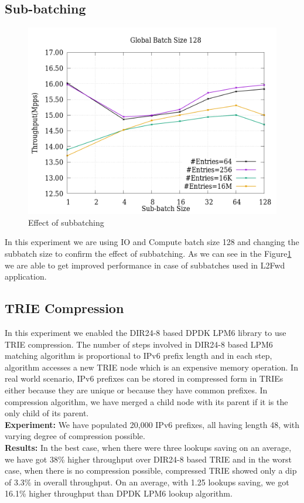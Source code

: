 \subsection{Sub-batching}
\begin{figure}[ht]
\includegraphics[width = \linewidth]{Figures/Subbatching.png}
\caption{Effect of subbatching}
\label{subbatchfigure}
\end{figure}

In this experiment we are using IO and Compute batch size 128 and changing the subbatch size to confirm the effect of subbatching. As we can see in the Figure\ref{subbatchfigure} we are able to get improved performance in case of subbatches used in L2Fwd application.
\subsection{TRIE Compression}
In this experiment we enabled the DIR24-8\cite{Gupta98routinglookups} based DPDK LPM6 library to use TRIE compression. The number of steps involved in DIR24-8 based LPM6 matching algorithm is proportional to IPv6 prefix length and in each step, algorithm accesses a new TRIE node which is an expensive memory operation. In real world scenario, IPv6 prefixes can be stored in compressed form in TRIEs either because they are unique or because they have common prefixes. In compression algorithm, we have merged a child node with its parent if it is the only child of its parent.
\\
\textbf{Experiment:} We have populated 20,000 IPv6 prefixes, all having length 48, with varying degree of compression possible.
\\
\textbf{Results:} In the best case, when there were three lookups saving on an average, we have got 38\% higher throughput over DIR24-8 based TRIE and in the worst case, when there is no compression possible, compressed TRIE showed only a dip of 3.3\% in overall throughput. On an average, with 1.25 lookups saving, we got 16.1\% higher throughput than DPDK LPM6 lookup algorithm.


